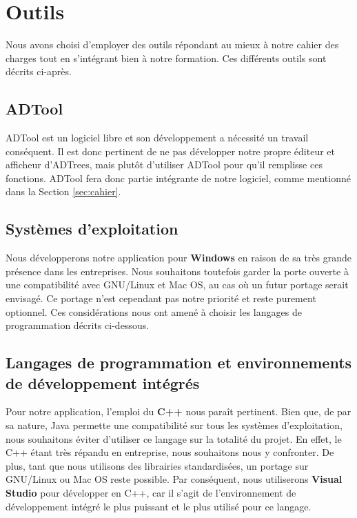 \section{Outils}
    \label{sec:outils}
    	
	Nous avons choisi d'employer des outils répondant au mieux à notre cahier des charges tout en s'intégrant bien à notre formation.  Ces différents outils sont décrits ci-après.
    	
    \subsection{ADTool}
    	ADTool est un logiciel libre et son développement a nécessité un travail conséquent. Il est donc pertinent de ne pas développer notre propre éditeur et afficheur d'ADTrees, mais plutôt d'utiliser ADTool pour qu'il remplisse ces fonctions. ADTool fera donc partie intégrante de notre logiciel, comme mentionné dans la Section \ref{sec:cahier}.

	\subsection{Systèmes d'exploitation}
	   Nous développerons notre application pour {\bf Windows} en raison de sa très grande présence dans les entreprises. Nous souhaitons toutefois garder la porte ouverte à une compatibilité avec GNU/Linux et Mac OS, au cas où un futur portage serait envisagé. Ce portage n'est cependant pas notre priorité et reste purement optionnel. Ces considérations nous ont amené à choisir les langages de programmation décrits ci-dessous.
	
    \subsection{Langages de programmation et environnements de développement intégrés}
        Pour notre application, l'emploi du {\bf C++} nous paraît pertinent. Bien que, de par sa nature, Java permette une compatibilité sur tous les systèmes d'exploitation, nous souhaitons éviter d'utiliser ce langage sur la totalité du projet. En effet, le C++ étant très répandu en entreprise, nous souhaitons nous y confronter. De plus, tant que nous utilisons des librairies standardisées, un portage sur GNU/Linux ou Mac OS reste possible. Par conséquent, nous utiliserons {\bf Visual Studio} pour développer en C++, car il s'agit de l'environnement de développement intégré le plus puissant et le plus utilisé pour ce langage.
        
